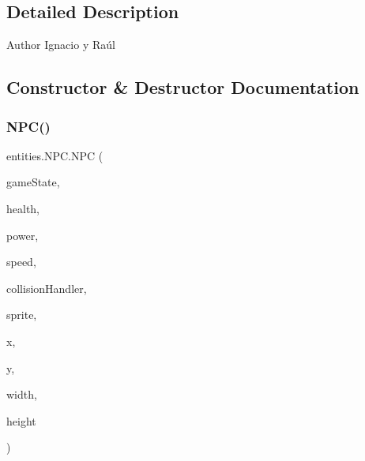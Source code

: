\subsection{Detailed Description}
\begin{DoxyAuthor}{Author}
Ignacio y Raúl 
\end{DoxyAuthor}


\subsection{Constructor \& Destructor Documentation}
\mbox{\label{classentities_1_1_n_p_c_ad392912a8fd646f1cdb22562344be5d0}} 
\subsubsection{\texorpdfstring{N\+P\+C()}{NPC()}}
{\footnotesize\ttfamily entities.\+N\+P\+C.\+N\+PC (\begin{DoxyParamCaption}\item[{\mbox{\hyperlink{classstates_1_1_game_state}{Game\+State}}}]{game\+State,  }\item[{int}]{health,  }\item[{int}]{power,  }\item[{float}]{speed,  }\item[{\mbox{\hyperlink{classentities_1_1_collision_handler}{Collision\+Handler}}}]{collision\+Handler,  }\item[{\mbox{\hyperlink{classorg_1_1newdawn_1_1slick_1_1_image}{Image}}}]{sprite,  }\item[{float}]{x,  }\item[{float}]{y,  }\item[{float}]{width,  }\item[{float}]{height }\end{DoxyParamCaption})\hspace{0.3cm}{\ttfamily [inline]}}


